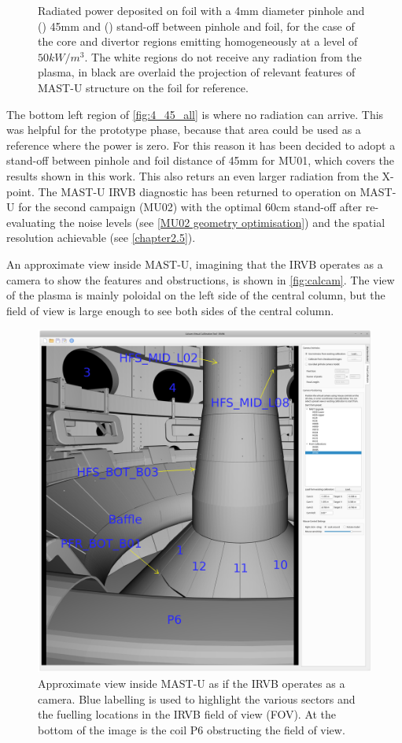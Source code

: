 \begin{figure}[!ht]
     \caption{Radiated power deposited on foil with a 4mm diameter pinhole and () 45mm and () stand-off between pinhole and foil, for the case of the core and divertor regions emitting homogeneously at a level of $50kW/m^3$. The white regions do not receive any radiation from the plasma, in black are overlaid the projection of relevant features of MAST-U structure on the foil for reference.}
    \label{fig:cherab2}
\end{figure}
The bottom left region of \autoref{fig:4_45_all} is where no radiation can arrive. This was helpful for the prototype phase, because that area could be used as a reference where the power is zero.
For this reason it has been decided to adopt a stand-off between pinhole and foil distance of 45mm for MU01, which covers the results shown in this work. This also returs an even larger radiation from the X-point. The MAST-U IRVB diagnostic has been returned to operation on MAST-U for the second campaign (MU02) with the optimal 60cm stand-off after re-evaluating the noise levels (see \autoref{MU02 geometry optimisation}) and the spatial resolution achievable (see \autoref{chapter2.5}).

An approximate view inside MAST-U, imagining that the IRVB operates as a camera to show the features and obstructions, is shown in \autoref{fig:calcam}. The view of the plasma is mainly poloidal on the left side of the central column, but the field of view is large enough to see both sides of the central column.

\begin{figure}[!ht]
	\centering
	\includegraphics[trim={30 30 450 90},clip,width=0.5\linewidth]{Chapters/chapter2/figs/calcam4.png}
	\caption{Approximate view inside MAST-U as if the IRVB operates as a camera. Blue labelling is used to highlight the various sectors and the fuelling locations in the IRVB field of view (FOV). At the bottom of the image is the coil P6 obstructing the field of view.}
	\label{fig:calcam}
\end{figure}

